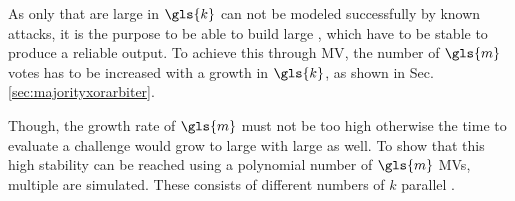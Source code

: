 As only \xpufs that are large in $\gls{k}$ can not be modeled successfully by known attacks, it is the purpose to be able to build large \xpufs, which have to be stable to produce a reliable output. %
To achieve this through \ac{MV}, the number of $\gls{m}$ votes has to be increased with a growth in $\gls{k}$, as shown in Sec. \ref{sec:majorityxorarbiter}.

Though, the growth rate of $\gls{m}$ must not be too high otherwise the time to evaluate a challenge would grow to large with large \xpufs as well. %
To show that this high stability can be reached using a polynomial number of $\gls{m}$ \acp{MV}, multiple \mxpufs are simulated.
These \mxpufs consists of different numbers of $k$ parallel \mpufs.


